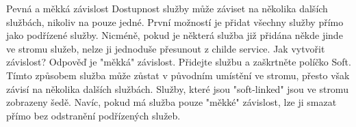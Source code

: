 \documentclass{article}
\begin{document}
Pevná a měkká závislost
\newline
Dostupnost služby může záviset na několika dalších službách, nikoliv na pouze jedné. První možností je přidat všechny služby přímo jako podřízené služby.
\newline
Nicméně, pokud je některá služba již přidána někde jinde ve stromu služeb, nelze ji jednoduše přesunout z childe service. Jak vytvořit závislost? Odpověď je "měkká" závislost. Přidejte službu a zaškrtněte políčko Soft. Tímto způsobem služba může zůstat v původním umístění ve stromu, přesto však závisí na několika dalších službách. Služby, které jsou "soft-linked" jsou ve stromu zobrazeny šedě. Navíc, pokud má služba pouze "měkké" závislost, lze ji smazat přímo bez odstranění podřízených služeb.
\end{document}

